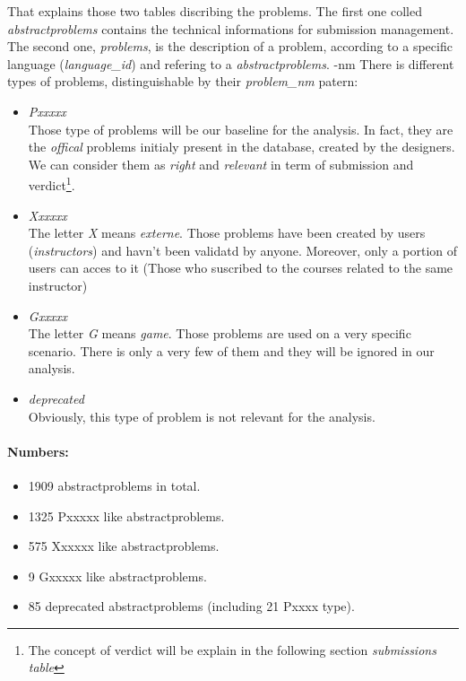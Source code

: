 \documentclass[../main.tex]{subfiles}
\begin{document}
That explains those two tables discribing the problems. The first one colled \emph{abstractproblems} contains the technical informations for submission management. The second one, \emph{problems}, is the description of a problem, according to a specific language (\emph{language\_id}) and refering to a \emph{abstractproblems}.
-nm
There is different types of problems, distinguishable by their \emph{problem\_nm} patern:
\begin{itemize}
	\setlength\itemsep{0em}
	\item \emph{Pxxxxx}\\
	Those type of problems will be our baseline for the analysis. In fact, they are the \emph{offical} problems initialy present in the database, created by the designers. We can consider them as \emph{right} and \emph{relevant} in term of submission and verdict\footnote{The concept of verdict will be explain in the following section \emph{submissions table}}.

	\item \emph{Xxxxxx}\\
	The letter \emph{X} means \emph{externe}. Those problems have been created by users (\emph{instructors}) and havn't been validatd by anyone. Moreover, only a portion of users can acces to it (Those who suscribed to the courses related to the same instructor)

	\item \emph{Gxxxxx}\\
	The letter \emph{G} means \emph{game}. Those problems are used on a very specific scenario. There is only a very few of them and they will be ignored in our analysis.

	\item \emph{deprecated}\\
	Obviously, this type of problem is not relevant for the analysis. 

\end{itemize}

\paragraph{Numbers:}%
\begin{itemize}
	\setlength\itemsep{0em}
	\item 1909 abstractproblems in total.
	\item 1325 Pxxxxx like abstractproblems.
	\item 575 Xxxxxx like abstractproblems.
	\item 9 Gxxxxx like abstractproblems.
	\item 85 deprecated abstractproblems (including 21 Pxxxx type). 
\end{itemize}
\end{document}
